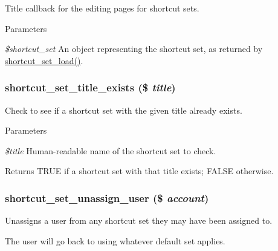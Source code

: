 Title callback for the editing pages for shortcut sets.


\begin{DoxyParams}{Parameters}
\item[{\em \$shortcut\_\-set}]An object representing the shortcut set, as returned by \hyperlink{shortcut_8module_a66161b6ac12978c1a31bb5c5bf27dc65}{shortcut\_\-set\_\-load()}. \end{DoxyParams}
\hypertarget{shortcut_8module_ac8fa00be9a5996238d85e6ce8705f29b}{
\subsubsection[{shortcut\_\-set\_\-title\_\-exists}]{\setlength{\rightskip}{0pt plus 5cm}shortcut\_\-set\_\-title\_\-exists (\$ {\em title})}}
\label{shortcut_8module_ac8fa00be9a5996238d85e6ce8705f29b}
Check to see if a shortcut set with the given title already exists.


\begin{DoxyParams}{Parameters}
\item[{\em \$title}]Human-\/readable name of the shortcut set to check.\end{DoxyParams}
\begin{DoxyReturn}{Returns}
TRUE if a shortcut set with that title exists; FALSE otherwise. 
\end{DoxyReturn}
\hypertarget{shortcut_8module_a6e62241388ccfec4481731923b336c60}{
\subsubsection[{shortcut\_\-set\_\-unassign\_\-user}]{\setlength{\rightskip}{0pt plus 5cm}shortcut\_\-set\_\-unassign\_\-user (\$ {\em account})}}
\label{shortcut_8module_a6e62241388ccfec4481731923b336c60}
Unassigns a user from any shortcut set they may have been assigned to.

The user will go back to using whatever default set applies.


